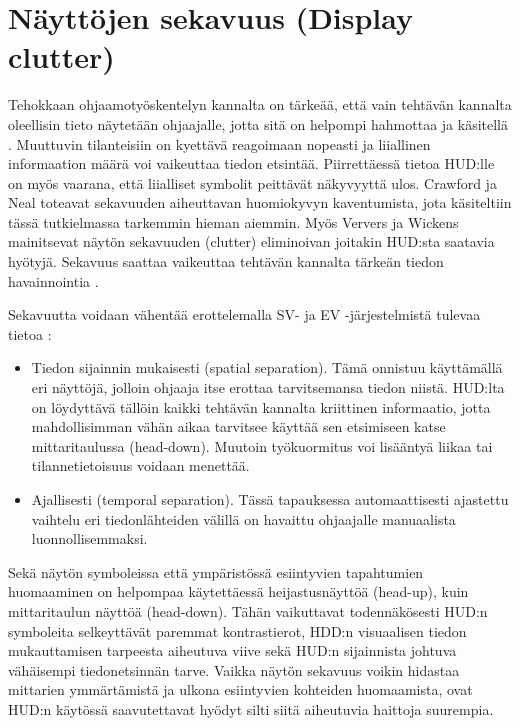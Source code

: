 \documentclass[utf8,bachelor,manualbib]{gradu3}
\begin{document}
\section{Näyttöjen sekavuus (Display clutter)}

Tehokkaan ohjaamotyöskentelyn kannalta on tärkeää, että vain tehtävän kannalta oleellisin tieto näytetään ohjaajalle, jotta sitä on helpompi hahmottaa ja käsitellä \citep{ververswickens1998}. Muuttuvin tilanteisiin on kyettävä reagoimaan nopeasti ja liiallinen informaation määrä voi vaikeuttaa tiedon etsintää. Piirrettäessä tietoa HUD:lle on myös vaarana, että liialliset symbolit peittävät näkyvyyttä ulos. Crawford ja Neal \citeyearpar{crawfordneal2006} toteavat sekavuuden aiheuttavan huomiokyvyn kaventumista, jota käsiteltiin tässä tutkielmassa tarkemmin hieman aiemmin. Myös Ververs ja Wickens \citeyearpar{ververswickens1996} mainitsevat näytön sekavuuden (clutter) eliminoivan joitakin HUD:sta saatavia hyötyjä. Sekavuus saattaa vaikeuttaa tehtävän kannalta tärkeän tiedon havainnointia \citep{nikolicym2004, stelzerwickens2006, wickensym2003}.

Sekavuutta voidaan vähentää erottelemalla SV- ja EV -järjestelmistä tulevaa tietoa \citep{baileyym2007}:

\begin{itemize}
\item Tiedon sijainnin mukaisesti (spatial separation).
Tämä onnistuu käyttämällä eri näyttöjä, jolloin ohjaaja itse erottaa tarvitsemansa tiedon niistä. HUD:lta on löydyttävä tällöin kaikki tehtävän kannalta kriittinen informaatio, jotta mahdollisimman vähän aikaa  tarvitsee käyttää sen etsimiseen katse mittaritaulussa (head-down). Muutoin työkuormitus voi lisääntyä liikaa tai tilannetietoisuus voidaan menettää.
\item Ajallisesti (temporal separation).
Tässä tapauksessa automaattisesti ajastettu vaihtelu eri tiedonlähteiden välillä on havaittu ohjaajalle manuaalista luonnollisemmaksi.
\end{itemize}

Sekä näytön symboleissa että ympäristössä esiintyvien tapahtumien huomaaminen on helpompaa käytettäessä heijastusnäyttöä (head-up), kuin mittaritaulun näyttöä (head-down). Tähän vaikuttavat todennäkösesti HUD:n symboleita selkeyttävät paremmat kontrastierot, HDD:n visuaalisen tiedon mukauttamisen tarpeesta aiheutuva viive sekä HUD:n sijainnista johtuva vähäisempi tiedonetsinnän tarve. Vaikka näytön sekavuus voikin hidastaa mittarien ymmärtämistä ja ulkona esiintyvien kohteiden huomaamista, ovat HUD:n käytössä saavutettavat hyödyt silti siitä aiheutuvia haittoja suurempia. \citep{ververswickens1998}
\end{document}
